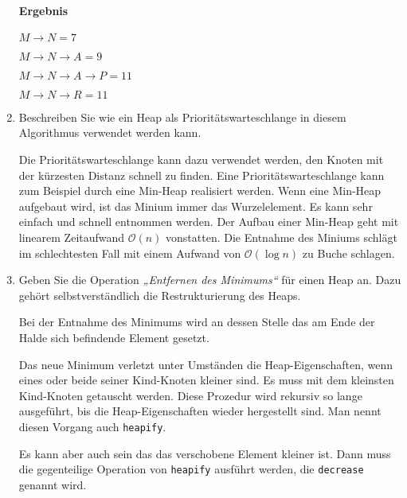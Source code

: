 \documentclass{lehramt-informatik-aufgabe}
\begin{document}
\begin{enumerate}
\paragraph{Ergebnis}

$M \rightarrow N = 7$

$M \rightarrow N \rightarrow A = 9$

$M \rightarrow N \rightarrow A \rightarrow P = 11$

$M \rightarrow N \rightarrow R = 11$


\item Beschreiben Sie wie ein Heap als
Prioritätswarteschlange in diesem Algorithmus verwendet werden kann.

\begin{liAntwort}
Die Prioritätswarteschlange kann dazu verwendet werden, den Knoten mit
der kürzesten Distanz schnell zu finden. Eine Prioritätswarteschlange
kann zum Beispiel durch eine Min-Heap realisiert werden. Wenn eine
Min-Heap aufgebaut wird, ist das Minium immer das Wurzelelement. Es kann
sehr einfach und schnell entnommen werden. Der Aufbau einer Min-Heap
geht mit linearem Zeitaufwand $\mathcal{O}(n)$ vonstatten. Die
Entnahme des Miniums schlägt im schlechtesten Fall mit einem Aufwand
von $\mathcal{O}(\log n)$ zu Buche schlagen.
\end{liAntwort}


\item Geben Sie die Operation \emph{„Entfernen des Minimums“} für einen
Heap an. Dazu gehört selbstverständlich die Restrukturierung des Heaps.

\begin{liAntwort}
Bei der Entnahme des Minimums wird an dessen Stelle das am Ende
der Halde sich befindende Element gesetzt.

Das neue Minimum verletzt unter Umständen die Heap-Eigenschaften, wenn
eines oder beide seiner Kind-Knoten kleiner sind. Es muss mit dem
kleinsten Kind-Knoten getauscht werden. Diese Prozedur wird rekursiv so
lange ausgeführt, bis die Heap-Eigenschaften wieder hergestellt sind.
Man nennt diesen Vorgang auch \texttt{heapify}.

Es kann aber auch sein das das verschobene Element kleiner ist. Dann
muss die gegenteilige Operation von \texttt{heapify} ausführt werden,
die \texttt{decrease} genannt wird.
\end{liAntwort}
\end{enumerate}
\end{document}
